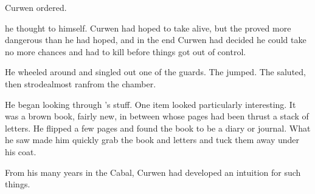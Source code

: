  Curwen ordered. 

 he thought to himself. 
Curwen had hoped to take \Onatol alive, but the \rethyax proved more dangerous than he had hoped, and in the end Curwen had decided he could take no more chances and had to kill \Onatol before things got out of control. 


He wheeled around and singled out one of the guards. 
 The \sphyle{} jumped. 
The \sphyle{} saluted, then strode\dash almost ran\dash from the chamber. 


He began looking through \Onatol's stuff. 
One item looked particularly interesting. 
It was a brown book, fairly new, in between whose pages had been thrust a stack of letters. 
He flipped a few pages and found the book to be a diary or journal. 
What he saw made him quickly grab the book and letters and tuck them away under his coat. 

From his many years in the Cabal, Curwen had developed an intuition for such things. 





